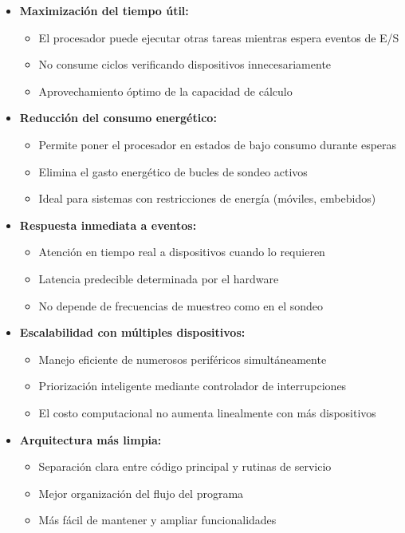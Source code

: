 \documentclass{article}
\begin{document}
\begin{itemize}[leftmargin=*]
    \item \textbf{Maximización del tiempo útil:}
    \begin{itemize}
        \item El procesador puede ejecutar otras tareas mientras espera eventos de E/S
        \item No consume ciclos verificando dispositivos innecesariamente
        \item Aprovechamiento óptimo de la capacidad de cálculo
    \end{itemize}
    
    \item \textbf{Reducción del consumo energético:}
    \begin{itemize}
        \item Permite poner el procesador en estados de bajo consumo durante esperas
        \item Elimina el gasto energético de bucles de sondeo activos
        \item Ideal para sistemas con restricciones de energía (móviles, embebidos)
    \end{itemize}
    
    \item \textbf{Respuesta inmediata a eventos:}
    \begin{itemize}
        \item Atención en tiempo real a dispositivos cuando lo requieren
        \item Latencia predecible determinada por el hardware
        \item No depende de frecuencias de muestreo como en el sondeo
    \end{itemize}
    
    \item \textbf{Escalabilidad con múltiples dispositivos:}
    \begin{itemize}
        \item Manejo eficiente de numerosos periféricos simultáneamente
        \item Priorización inteligente mediante controlador de interrupciones
        \item El costo computacional no aumenta linealmente con más dispositivos
    \end{itemize}
    
    \item \textbf{Arquitectura más limpia:}
    \begin{itemize}
        \item Separación clara entre código principal y rutinas de servicio
        \item Mejor organización del flujo del programa
        \item Más fácil de mantener y ampliar funcionalidades
    \end{itemize}
\end{itemize}
\end{document}
